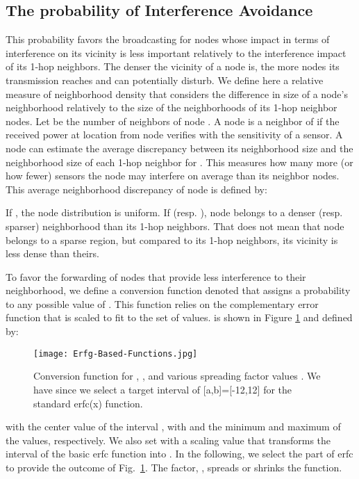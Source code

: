 \documentclass[journal, peerreview, onecolumn, draftcls]{IEEEtran}
\begin{document}
\subsection{The probability of Interference Avoidance}

This probability favors the broadcasting for nodes whose impact in terms of interference on its vicinity is less important relatively to the interference impact of its 1-hop neighbors.
The denser the vicinity of a node is, the more nodes its transmission reaches and can potentially disturb. We define here a relative measure of neighborhood density that considers the difference in size of a node's neighborhood relatively to the size of the neighborhoods of its 1-hop neighbor nodes.
Let  be the number of neighbors of node . A node  is a neighbor of  if the received power  at location  from node  verifies  with  the sensitivity of a sensor.
A node  can estimate the average discrepancy between its neighborhood size  and the neighborhood size  of each 1-hop neighbor  for . This measures how many more (or how fewer) sensors the node  may interfere on average than its neighbor nodes.
This average neighborhood discrepancy  of node  is defined by:


If , the node distribution is uniform. If  (resp. ), node  belongs to a denser (resp. sparser) neighborhood than its 1-hop neighbors. That does not mean that node  belongs to a sparse region, but compared to its 1-hop neighbors, its vicinity is less dense than theirs.

To favor the forwarding of nodes that provide less interference to their neighborhood, we define a conversion function denoted  that assigns a probability  to any possible value of . This function relies on the complementary error function  that is scaled to fit to the set of  values.  is shown in Figure \ref{fig:fIAErfc} and defined by:


\begin{figure}
\centering
  \texttt{[image: Erfg-Based-Functions.jpg]}
    \caption{Conversion function  for , ,  and various spreading factor values . We have  since we select a target interval of [a,b]=[-12,12] for the standard erfc(x) function.}
    \label{fig:fIAErfc}
\end{figure}

with  the center value of the interval , with  and  the minimum and maximum of the  values, respectively. We also set  with  a scaling value that transforms the interval  of the basic erfc function into . In the following, we select the part  of erfc to provide the outcome of Fig.~\ref{fig:fIAErfc}. The  factor, , spreads or shrinks the function.
\end{document}
